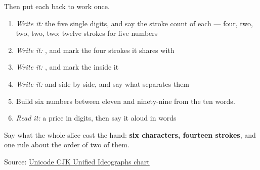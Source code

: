 Then put each back to work once.

\begin{enumerate}
\raggedright
  \item \emph{Write it:} the five single digits, and say the stroke count of each — four, two, two, two, two; twelve strokes for five numbers
  \item \emph{Write it:} \textbf{}, and mark the four strokes it shares with \textbf{}
  \item \emph{Write it:} \textbf{}, and mark the \textbf{} inside it
  \item \emph{Write it:} \textbf{} and \textbf{} side by side, and say what separates them
  \item Build six numbers between eleven and ninety-nine from the ten words.
  \item \emph{Read it:} a price in digits, then say it aloud in words
\end{enumerate}

Say what the whole slice cost the hand: \textbf{six characters, fourteen strokes}, and one rule about the order of two of them.

\begin{tcolorbox}[breakable,colback=teal!4,colframe=teal!35!black,title={Before you move on}]
Source: \href{https://www.unicode.org/charts/PDF/U4E00.pdf}{Unicode CJK Unified Ideographs chart}
\end{tcolorbox}

